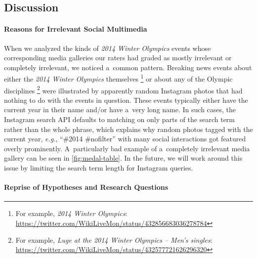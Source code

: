 \documentclass{sig-alternate}
\newcommand{\inlinelistingsize}{\fontsize{8pt}{11pt}}
\let\oldurl\url
\renewcommand{\url}[1]{\inlinelistingsize\oldurl{#1}}
\begin{document}
\subsection{Discussion}
\label{sec:discussion}

\paragraph{Reasons for Irrelevant Social Multimedia}

When we analyzed the kinds of \emph{2014 Winter Olympics} events
whose corresponding media galleries our raters
had graded as mostly irrelevant or completely irrelevant,
we noticed a~common pattern.
Breaking news events about either the
\emph{2014 Winter Olympics} themselves%
\footnote{For example, \emph{2014 Winter Olympics}:
\url{https://twitter.com/WikiLiveMon/status/432856683036278784}}
or about any of the Olympic disciplines%
\footnote{For example, \emph{Luge at the 2014 Winter Olympics -- Men's singles}:
\url{https://twitter.com/WikiLiveMon/status/432577721626296320}}
were illustrated by apparently random Instagram photos
that had nothing to do with the events in question. 
These events typically either have the current year in their name
and/or have a~very long name.
In such cases, the Instagram search API defaults to matching
on only parts of the search term rather than the whole phrase,
which explains why random photos tagged with the current year,
\emph{e.g.}, ``\#2014 \#nofilter'' with many social interactions
got featured overly prominently.
A~particularly bad example of a~completely irrelevant media gallery
can be seen in \autoref{fig:medal-table}.
In the future, we will work around this issue by limiting the search term
length for Instagram queries.

\paragraph{Reprise of Hypotheses and Research Questions}
\end{document}
